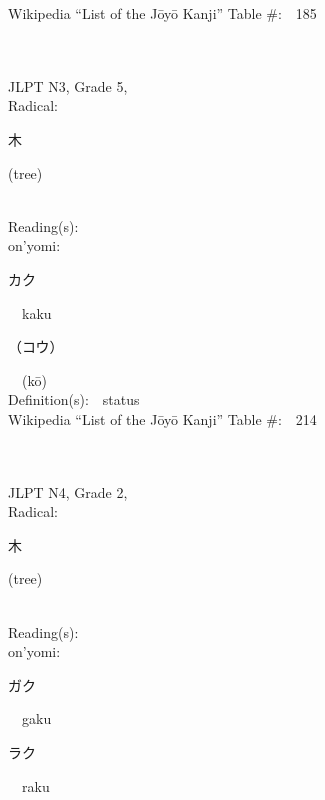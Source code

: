 \begin{multicols}{2}
Wikipedia ``List of the J\=oy\=o Kanji'' Table \#:\ \ 185 \\
\ \ \\
{\fontsize{34pt}{40pt}  }\ \ \\  %
{JLPT N3, Grade 5, \\Radical:\ \ {\begin{CJK}{UTF8}{min} 木 \end{CJK}} (tree) } \\
Reading(s):\ \ \\
{\hspace*{1em}}on'yomi:\ \ \\
{\hspace*{2em}}{\begin{CJK}{UTF8}{min} カク \end{CJK}}\ \ kaku\ \ \\
{\hspace*{2em}}{\begin{CJK}{UTF8}{min} （コウ） \end{CJK}}\ \ (k\=o)\ \ \\
Definition(s):\ \ status \\
Wikipedia ``List of the J\=oy\=o Kanji'' Table \#:\ \ 214 \\
\ \ \\
{\fontsize{34pt}{40pt}  }\ \ \\  %
{JLPT N4, Grade 2, \\Radical:\ \ {\begin{CJK}{UTF8}{min} 木 \end{CJK}} (tree) } \\
Reading(s):\ \ \\
{\hspace*{1em}}on'yomi:\ \ \\
{\hspace*{2em}}{\begin{CJK}{UTF8}{min} ガク \end{CJK}}\ \ gaku\ \ \\
{\hspace*{2em}}{\begin{CJK}{UTF8}{min} ラク \end{CJK}}\ \ raku\ \ \\

\end{multicols}
